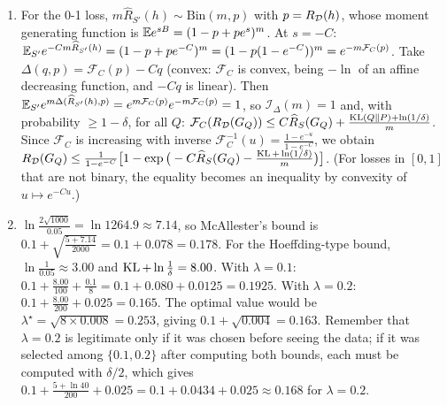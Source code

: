 \documentclass[11pt]{article}
\begin{document}
\begin{solution}
\begin{enumerate}
      holds. \emph{Correct way:} fix a grid $\lambda_1<\dots<\lambda_k$ in advance, apply the bound to each $\lambda_j$ with
      confidence $\delta/k$ (union bound): with probability $\geq1-\delta$ all $k$ bounds hold, and we can take the best
      one. The price is $\frac{\ln k}{\lambda m}$ (i.e.\ $\ln k$ added to $\ln\frac1\delta$) plus the error due to the
      discretization; a geometric grid with ratio $2$ covering $[10^{-3},1]$ has $k=10$ points and costs $\ln10\approx2.3$ nats.
\item For the 0-1 loss, $m\widehat R_{S'}(h)\sim\mathrm{Bin}(m,p)$ with $p=R_{\mathcal{D}}(h)$, whose moment generating function is
      $\mathbb{E} e^{sB}=(1-p+pe^s)^m$. At $s=-C$: $\mathbb{E}_{S'}e^{-Cm\widehat R_{S'}(h)}=(1-p+pe^{-C})^m=(1-p(1-e^{-C}))^m=e^{-m\mathcal F_C(p)}$.
      Take $\Delta(q,p)=\mathcal F_C(p)-Cq$ (convex: $\mathcal F_C$ is convex, being $-\ln$ of an affine decreasing function,
      and $-Cq$ is linear). Then $\mathbb{E}_{S'}e^{m\Delta(\widehat R_{S'}(h),p)}=e^{m\mathcal F_C(p)}e^{-m\mathcal F_C(p)}=1$, so
      $\mathcal I_\Delta(m)=1$ and, with probability $\geq1-\delta$, for all $Q$:
      $\mathcal F_C(R_{\mathcal{D}}(G_{Q}))\leq C\widehat{R}_{S}(G_{Q})+\frac{\operatorname{KL}(Q\|P)+\ln(1/\delta)}m$. Since $\mathcal F_C$ is increasing with inverse
      $\mathcal F_C^{-1}(u)=\frac{1-e^{-u}}{1-e^{-C}}$, we obtain
      $R_{\mathcal{D}}(G_{Q})\leq\frac{1}{1-e^{-C}}\big[1-\exp\big(-C\widehat{R}_{S}(G_{Q})-\frac{\operatorname{KL}+\ln(1/\delta)}m\big)\big]$. (For losses in $[0,1]$
      that are not binary, the equality becomes an inequality by convexity of $u\mapsto e^{-Cu}$.)
\item $\ln\frac{2\sqrt{1000}}{0.05}=\ln1264.9\approx7.14$, so McAllester's bound is
      $0.1+\sqrt{\frac{5+7.14}{2000}}=0.1+0.078=0.178$. For the Hoeffding-type bound, $\ln\frac1{0.05}\approx3.00$ and
      $\operatorname{KL}+\ln\frac1\delta=8.00$. With $\lambda=0.1$: $0.1+\frac{8.00}{100}+\frac{0.1}8=0.1+0.080+0.0125=0.1925$. With
      $\lambda=0.2$: $0.1+\frac{8.00}{200}+0.025=0.165$. The optimal value would be $\lambda^\star=\sqrt{8\times0.008}=0.253$,
      giving $0.1+\sqrt{0.004}=0.163$. Remember that $\lambda=0.2$ is legitimate only if it was chosen before seeing the
      data; if it was selected among $\{0.1,0.2\}$ after computing both bounds, each must be computed with $\delta/2$,
      which gives $0.1+\frac{5+\ln40}{200}+0.025=0.1+0.0434+0.025\approx0.168$ for $\lambda=0.2$.
\end{enumerate}
\end{solution}
\end{document}

